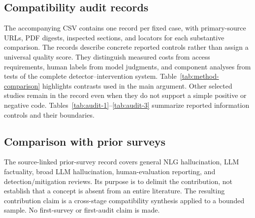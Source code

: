 \subsection{Compatibility audit records}\label{app:audit}
The accompanying CSV contains one record per fixed case, with primary-source URLs, PDF digests, inspected sections, and locators for each substantive comparison. The records describe concrete reported controls rather than assign a universal quality score. They distinguish measured costs from access requirements, human labels from model judgments, and component analyses from tests of the complete detector--intervention system. Table~\ref{tab:method-comparison} highlights contrasts used in the main argument. Other selected studies remain in the record even when they do not support a simple positive or negative code. Tables~\ref{tab:audit-1}--\ref{tab:audit-3} summarize reported information controls and their boundaries.

\FloatBarrier

\subsection{Comparison with prior surveys}\label{app:prior}
The source-linked prior-survey record covers general NLG hallucination, LLM factuality, broad LLM hallucination, human-evaluation reporting, and detection/mitigation reviews. Its purpose is to delimit the contribution, not establish that a concept is absent from an entire literature. The resulting contribution claim is a cross-stage compatibility synthesis applied to a bounded sample. No first-survey or first-audit claim is made.
